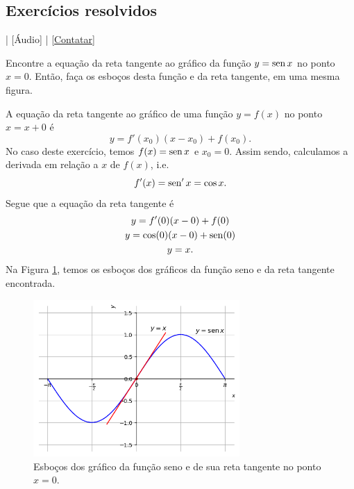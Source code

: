 \subsection*{Exercícios resolvidos}

\begin{flushright}
  [Vídeo] | [Áudio] | \href{https://phkonzen.github.io/notas/contato.html}{[Contatar]}
\end{flushright}

\begin{exeresol}
  Encontre a equação da reta tangente ao gráfico da função $y = \operatorname{sen} x$ no ponto $x=0$. Então, faça os esboços desta função e da reta tangente, em uma mesma figura.
\end{exeresol}
\begin{resol}
  A equação da reta tangente ao gráfico de uma função $y = f(x)$ no ponto $x=x+0$ é
  \begin{equation}
    y = f'(x_0)(x-x_0)+f(x_0).
  \end{equation}
  No caso deste exercício, temos $f(x)=\operatorname{sen} x$ e $x_0=0$. Assim sendo, calculamos a derivada em relação a $x$ de $f(x)$, i.e.
  \begin{equation}
    f'(x) = \operatorname{sen}' x = \cos x.
  \end{equation}
  Segue que a equação da reta tangente é
  \begin{gather}
    y = f'(0)(x-0)+f(0) \\
    y = \cos(0)(x-0)+\operatorname{sen}(0) \\
    y = x.
  \end{gather}
  Na Figura \ref{fig:deriv_exeresol_rt_sen0}, temos os esboços dos gráficos da função seno e da reta tangente encontrada.

  \begin{figure}[H]
    \centering
    \includegraphics[width=0.7\textwidth]{./cap_deriv/dados/fig_deriv_exeresol_rt_sen0/fig_deriv_exeresol_rt_sen0}
    \caption{Esboços dos gráfico da função seno e de sua reta tangente no ponto $x=0$.}
    \label{fig:deriv_exeresol_rt_sen0}
  \end{figure}


\end{resol}
